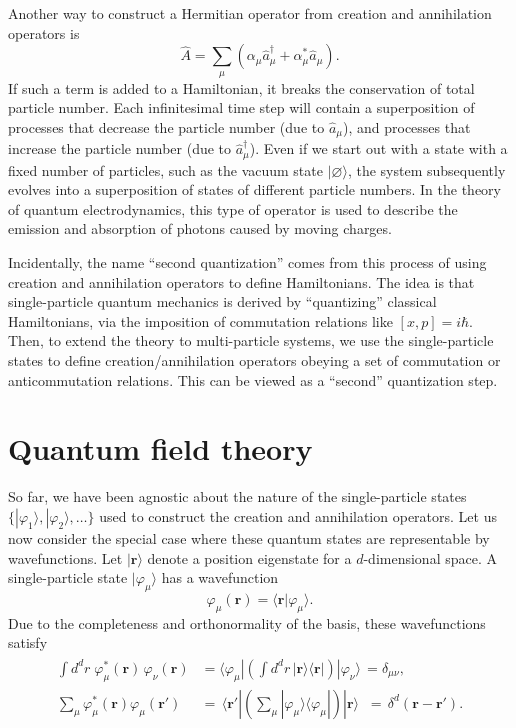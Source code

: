 \documentclass[pra,12pt]{revtex4}
\begin{document}
Another way to construct a Hermitian operator from creation and
annihilation operators is
\begin{equation}
  \hat{A} = \sum_\mu \left(\alpha_\mu \hat{a}_\mu^\dagger + \alpha^*_\mu \hat{a}_\mu\right).
\end{equation}
If such a term is added to a Hamiltonian, it breaks the conservation
of total particle number.  Each infinitesimal time step will contain a
superposition of processes that decrease the particle number (due to
$\hat{a}_\mu$), and processes that increase the particle number (due
to $\hat{a}_\mu^\dagger$).  Even if we start out with a state with a
fixed number of particles, such as the vacuum state
$|\varnothing\rangle$, the system subsequently evolves into a
superposition of states of different particle numbers.  In the
theory of quantum electrodynamics, this type of operator is used to
describe the emission and absorption of photons caused by moving
charges.

Incidentally, the name ``second quantization'' comes from this process
of using creation and annihilation operators to define Hamiltonians.
The idea is that single-particle quantum mechanics is derived by
``quantizing'' classical Hamiltonians, via the imposition of
commutation relations like $[x,p] = i\hbar$.  Then, to extend the
theory to multi-particle systems, we use the single-particle states to
define creation/annihilation operators obeying a set of commutation or
anticommutation relations.  This can be viewed as a ``second''
quantization step.

\section{Quantum field theory}
\label{sec:qft}

So far, we have been agnostic about the nature of the single-particle
states $\{|\varphi_1\rangle,|\varphi_2\rangle,\dots\}$ used to
construct the creation and annihilation operators.  Let us now
consider the special case where these quantum states are representable
by wavefunctions.  Let $|\mathbf{r}\rangle$ denote a position
eigenstate for a $d$-dimensional space.  A single-particle state
$|\varphi_\mu\rangle$ has a wavefunction
\begin{equation}
  \varphi_\mu(\mathbf{r}) = \langle\mathbf{r}|\varphi_\mu\rangle.
\end{equation}
Due to the completeness and orthonormality of the basis, these
wavefunctions satisfy
\begin{align}
  \begin{aligned}\int d^dr \; \varphi_\mu^*(\mathbf{r})\, \varphi_\nu(\mathbf{r}) &= \langle\varphi_\mu| \left(\int d^dr\, |\mathbf{r}\rangle\langle\mathbf{r}|\right) |\varphi_\nu\rangle \,= \delta_{\mu\nu}, \\\sum_\mu \varphi_\mu^*(\mathbf{r}) \varphi_\mu(\mathbf{r}') &=\, \langle \mathbf{r}'| \left(\sum_\mu |\varphi_\mu\rangle\langle\varphi_\mu|\right)|\mathbf{r}\rangle \;\;=\, \delta^d(\mathbf{r}-\mathbf{r}').\end{aligned}
\end{align}
\end{document}
